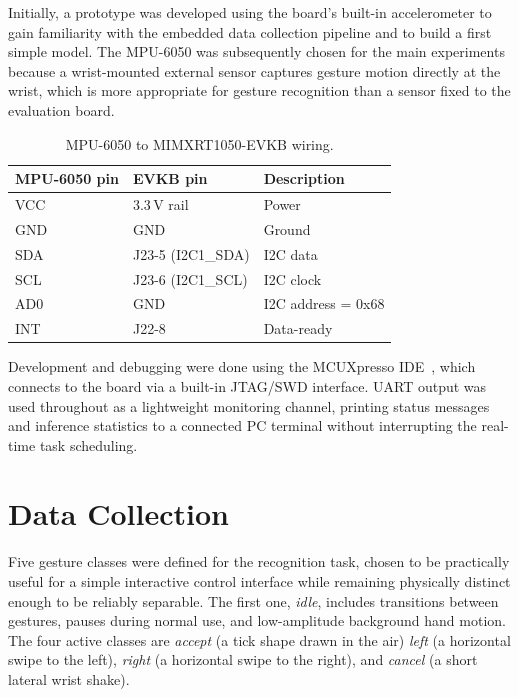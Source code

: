 Initially, a prototype was developed using the board's built-in accelerometer to gain familiarity with the embedded data collection pipeline and to build a first simple model. The MPU-6050 was subsequently chosen for the main experiments because a wrist-mounted external sensor captures gesture motion directly at the wrist, which is more appropriate for gesture recognition than a sensor fixed to the evaluation board.

\begin{table}[ht]
  \centering
  \caption{MPU-6050 to MIMXRT1050-EVKB wiring.}
  \label{tab:wiring}
  \begin{tabular}{lll}
    \toprule
    \textbf{MPU-6050 pin} & \textbf{EVKB pin} & \textbf{Description} \\
    \midrule
    VCC & 3.3\,V rail & Power \\
    GND & GND         & Ground \\
    SDA & J23-5 (I2C1\_SDA) & I2C data \\
    SCL & J23-6 (I2C1\_SCL) & I2C clock \\
    AD0 & GND & I2C address = 0x68 \\
    INT & J22-8 & Data-ready \\
    \bottomrule
  \end{tabular}
\end{table}

Development and debugging were done using the MCUXpresso IDE~\cite{mcuxpressoide}, which connects to the board via a built-in JTAG/SWD interface. UART output was used throughout as a lightweight monitoring channel, printing status messages and inference statistics to a connected PC terminal without interrupting the real-time task scheduling.

\section{Data Collection}
 
Five gesture classes were defined for the recognition task, chosen to be practically useful for a simple interactive control interface while remaining physically distinct enough to be reliably separable. The first one, \emph{idle}, includes transitions between gestures, pauses during normal use, and low-amplitude background hand motion. The four active classes are \emph{accept} (a tick shape drawn in the air) \emph{left} (a horizontal swipe to the left), \emph{right} (a horizontal swipe to the right), and \emph{cancel} (a short lateral wrist shake). 

